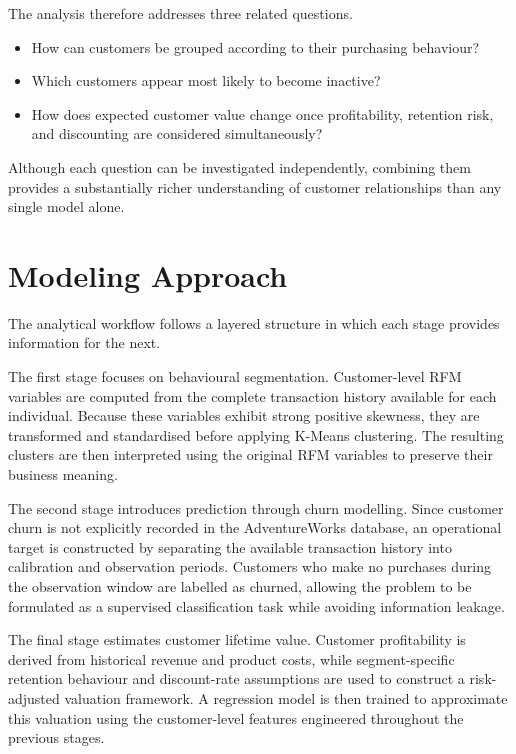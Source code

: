 \documentclass[
  12pt,
  letterpaper,
]{book}
\providecommand{\tightlist}{%
  \setlength{\itemsep}{0pt}\setlength{\parskip}{0pt}}
\begin{document}
The analysis therefore addresses three related questions.

\begin{itemize}
\tightlist
\item
  How can customers be grouped according to their purchasing behaviour?
\item
  Which customers appear most likely to become inactive?
\item
  How does expected customer value change once profitability, retention
  risk, and discounting are considered simultaneously?
\end{itemize}

Although each question can be investigated independently, combining them
provides a substantially richer understanding of customer relationships
than any single model alone.

\section{Modeling Approach}\label{modeling-approach-4}

The analytical workflow follows a layered structure in which each stage
provides information for the next.

The first stage focuses on behavioural segmentation. Customer-level RFM
variables are computed from the complete transaction history available
for each individual. Because these variables exhibit strong positive
skewness, they are transformed and standardised before applying K-Means
clustering. The resulting clusters are then interpreted using the
original RFM variables to preserve their business meaning.

The second stage introduces prediction through churn modelling. Since
customer churn is not explicitly recorded in the AdventureWorks
database, an operational target is constructed by separating the
available transaction history into calibration and observation periods.
Customers who make no purchases during the observation window are
labelled as churned, allowing the problem to be formulated as a
supervised classification task while avoiding information leakage.

The final stage estimates customer lifetime value. Customer
profitability is derived from historical revenue and product costs,
while segment-specific retention behaviour and discount-rate assumptions
are used to construct a risk-adjusted valuation framework. A regression
model is then trained to approximate this valuation using the
customer-level features engineered throughout the previous stages.
\end{document}
